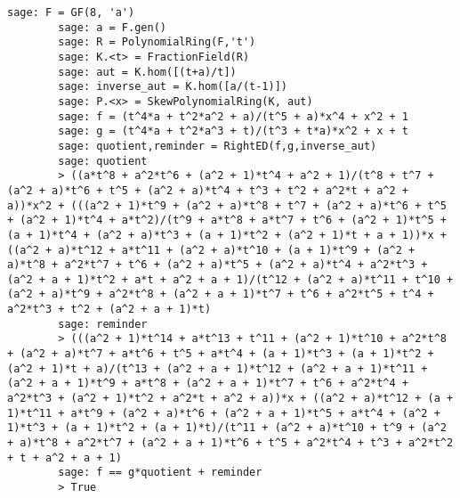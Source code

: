 \begin{description}[leftmargin=1em, font=\ttfamily, style=nextline]
    \begin{lstlisting}[gobble=8]
        sage: F = GF(8, 'a')
        sage: a = F.gen()
        sage: R = PolynomialRing(F,'t')
        sage: K.<t> = FractionField(R)
        sage: aut = K.hom([(t+a)/t])
        sage: inverse_aut = K.hom([a/(t-1)])
        sage: P.<x> = SkewPolynomialRing(K, aut)
        sage: f = (t^4*a + t^2*a^2 + a)/(t^5 + a)*x^4 + x^2 + 1
        sage: g = (t^4*a + t^2*a^3 + t)/(t^3 + t*a)*x^2 + x + t
        sage: quotient,reminder = RightED(f,g,inverse_aut)
        sage: quotient
        > ((a*t^8 + a^2*t^6 + (a^2 + 1)*t^4 + a^2 + 1)/(t^8 + t^7 + (a^2 + a)*t^6 + t^5 + (a^2 + a)*t^4 + t^3 + t^2 + a^2*t + a^2 + a))*x^2 + (((a^2 + 1)*t^9 + (a^2 + a)*t^8 + t^7 + (a^2 + a)*t^6 + t^5 + (a^2 + 1)*t^4 + a*t^2)/(t^9 + a*t^8 + a*t^7 + t^6 + (a^2 + 1)*t^5 + (a + 1)*t^4 + (a^2 + a)*t^3 + (a + 1)*t^2 + (a^2 + 1)*t + a + 1))*x + ((a^2 + a)*t^12 + a*t^11 + (a^2 + a)*t^10 + (a + 1)*t^9 + (a^2 + a)*t^8 + a^2*t^7 + t^6 + (a^2 + a)*t^5 + (a^2 + a)*t^4 + a^2*t^3 + (a^2 + a + 1)*t^2 + a*t + a^2 + a + 1)/(t^12 + (a^2 + a)*t^11 + t^10 + (a^2 + a)*t^9 + a^2*t^8 + (a^2 + a + 1)*t^7 + t^6 + a^2*t^5 + t^4 + a^2*t^3 + t^2 + (a^2 + a + 1)*t)
        sage: reminder
        > (((a^2 + 1)*t^14 + a*t^13 + t^11 + (a^2 + 1)*t^10 + a^2*t^8 + (a^2 + a)*t^7 + a*t^6 + t^5 + a*t^4 + (a + 1)*t^3 + (a + 1)*t^2 + (a^2 + 1)*t + a)/(t^13 + (a^2 + a + 1)*t^12 + (a^2 + a + 1)*t^11 + (a^2 + a + 1)*t^9 + a*t^8 + (a^2 + a + 1)*t^7 + t^6 + a^2*t^4 + a^2*t^3 + (a^2 + 1)*t^2 + a^2*t + a^2 + a))*x + ((a^2 + a)*t^12 + (a + 1)*t^11 + a*t^9 + (a^2 + a)*t^6 + (a^2 + a + 1)*t^5 + a*t^4 + (a^2 + 1)*t^3 + (a + 1)*t^2 + (a + 1)*t)/(t^11 + (a^2 + a)*t^10 + t^9 + (a^2 + a)*t^8 + a^2*t^7 + (a^2 + a + 1)*t^6 + t^5 + a^2*t^4 + t^3 + a^2*t^2 + t + a^2 + a + 1)
        sage: f == g*quotient + reminder
        > True
    \end{lstlisting} 
\end{description}   

